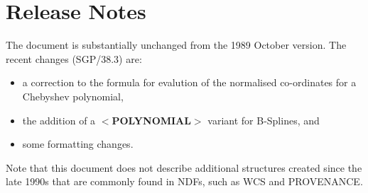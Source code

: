 \documentclass[twoside,11pt,nolof,noabs]{starlink}
\begin{document}
\appendix
\section{Release Notes}
The document is substantially unchanged from the 1989 October version.
The recent changes (SGP/38.3) are:
\begin{itemize}
\item a correction to the formula for evalution of the normalised
co-ordinates for a Chebyshev polynomial,
\item the addition of a $<$\textbf{POLYNOMIAL}$>$ variant for B-Splines,
and
\item some formatting changes.
\end{itemize}

Note that this document does not describe additional structures
created since the late 1990s that are commonly found in NDFs, such as
WCS and PROVENANCE.
\end{document}
